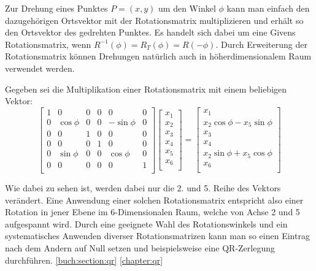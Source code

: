 Zur Drehung eines Punktes $P=(x,y)$ um den Winkel $\phi$ kann man einfach den dazugehörigen Ortsvektor mit der Rotationsmatrix multiplizieren und erhält so den Ortsvektor des gedrehten Punktes.
Es handelt sich dabei um eine Givens Rotationsmatrix, wenn $R^{-1}(\phi)=R_{T}(\phi)=R(-\phi)$.
Durch Erweiterung der Rotationsmatrix können Drehungen natürlich auch in höherdimensionalem Raum verwendet werden. 

\begin{beispiel}
	Gegeben sei die Multiplikation einer Rotationsmatrix mit einem beliebigen Vektor:
	\begin{equation}
	\begin{bmatrix}
	1 & 0 & 0 & 0 & 0 & 0 \\
	0 & \cos\phi & 0 & 0 & -\sin\phi & 0 \\
	0 & 0 & 1 & 0 & 0 & 0 \\
	0 & 0 & 0 & 1 & 0 & 0 \\
	0 & \sin\phi & 0 & 0 & \cos\phi & 0 \\
	0 & 0 & 0 & 0 & 0 & 1 \\
	\end{bmatrix}
	\begin{bmatrix}
	x_{1}\\
	x_{2}\\
	x_{3}\\
	x_{4}\\
	x_{5}\\
	x_{6}\\
	\end{bmatrix}
	=
	\begin{bmatrix}
	x_{1}\\
	x_{2}\cos\phi-x_{5}\sin\phi\\
	x_{3}\\
	x_{4}\\
	x_{2}\sin\phi+x_{5}\cos\phi\\
	x_{6}\\
	\end{bmatrix}
	\end{equation}	
	
	Wie dabei zu sehen ist, werden dabei nur die 2. und 5. Reihe des Vektors verändert.
	Eine Anwendung einer solchen Rotationsmatrix entspricht also einer Rotation in jener Ebene im 6-Dimensionalen Raum, welche von Achse 2 und 5 aufgespannt wird.
	Durch eine geeignete Wahl des Rotationswinkels und ein systematisches Anwenden diverser Rotationsmatrizen kann man so einen Eintrag nach dem Andern auf Null setzen und beispielsweise eine QR-Zerlegung durchführen. \cite{francis:QR_Zerlegung} \ref{buch:section:qr} \ref{chapter:qr}
\end{beispiel}

